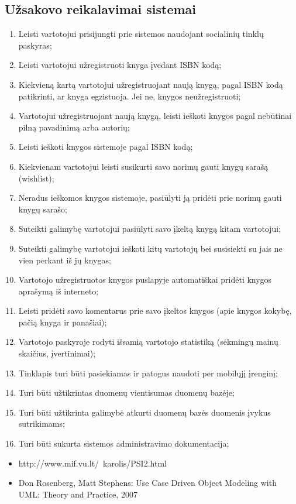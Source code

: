 \documentclass{VUMIFPSkursinis}
\begin{document}
\subsection{Užsakovo reikalavimai sistemai}
\begin{enumerate}
	\item Leisti vartotojui prisijungti prie sistemos naudojant socialinių tinklų paskyras;
	\item Leisti vartotojui užregistruoti knyga įvedant ISBN kodą;
	\item Kiekvieną kartą vartotojui užregistruojant naują knygą, pagal ISBN kodą patikrinti,
		ar knyga egzistuoja. Jei ne, knygos neužregistruoti;
	\item Vartotojui užregistruojant naują knygą, leisti ieškoti knygos pagal 
		nebūtinai pilną pavadinimą arba autorių;
	\item Leisti ieškoti knygos sistemoje pagal ISBN kodą;
	\item Kiekvienam vartotojui leisti susikurti savo norimų gauti knygų sarašą (wishlist);
	\item Neradus ieškomos knygos sistemoje, pasiūlyti ją pridėti prie norimų gauti knygų sarašo;
	\item Suteikti galimybę vartotojui pasiūlyti savo įkeltą knygą kitam vartotojui;
	\item Suteikti galimybę vartotojui ieškoti kitų vartotojų bei susisiekti su jais ne vien
		perkant iš jų knygas;
	\item Vartotojo užregistruotos knygos puslapyje automatiškai pridėti knygos aprašymą
		iš interneto;
	\item Leisti pridėti savo komentarus prie savo įkeltos knygos (apie knygos kokybę,
		pačią knyga ir panašiai);
	\item Vartotojo paskyroje rodyti išsamią vartotojo statistiką (sėkmingų mainų skaičius,
		įvertinimai);
	\item Tinklapis turi būti pasiekiamas ir patogus naudoti per mobilųjį įrenginį;
	\item Turi būti užtikrintas duomenų vientisumas duomenų bazėje;
	\item Turi būti užtikrinta galimybė atkurti duomenų bazės duomenis įvykus sutrikimams;
	\item Turi būti sukurta sistemos administravimo dokumentacija;
\end{enumerate}


\setcounter{secnumdepth}{4}


	\begin{itemize}
		\item http://www.mif.vu.lt/~karolis/PSI2.html
		\item Don Rosenberg, Matt Stephens: Use Case Driven Object Modeling with UML: Theory and Practice, 2007
	\end{itemize}

\end{document}
